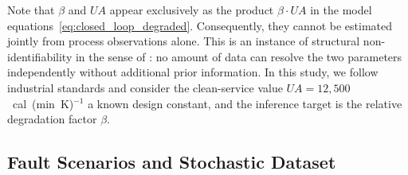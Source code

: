 \documentclass[aps,pre,twocolumn,superscriptaddress]{revtex4-2}
\begin{document}


Note that $\beta$ and $U\!A$ appear exclusively as the product $\beta \cdot U\!A$ in the model equations~\eqref{eq:closed_loop_degraded}. Consequently, they cannot be estimated jointly from process observations alone. This is an instance of structural non-identifiability in the sense of \citet{Ljung1999}: no amount of data can resolve the two parameters independently without additional prior information. In this study, we follow industrial standards and consider the clean-service value $U\!A = 12{,}500$~cal~(min~K)$^{-1}$ a known design constant, and the inference target is the relative degradation factor $\beta$.



\subsection{Fault Scenarios and Stochastic Dataset}
\label{sec:scenarios}
\end{document}
